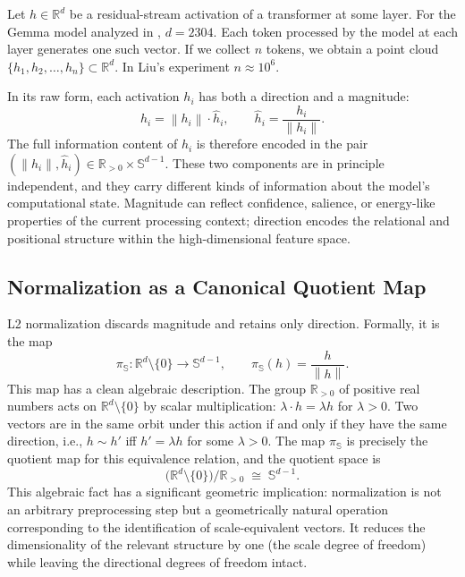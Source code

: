 \documentclass[12pt, a4paper]{article}
\theoremstyle{plain}
\theoremstyle{definition}
\theoremstyle{remark}
\newcommand{\R}{\mathbb{R}}
\newcommand{\Sph}{\mathbb{S}}
\newcommand{\norm}[1]{\left\|#1\right\|}
\newcommand{\hh}{\hat{h}}
\newcommand{\lra}{\longrightarrow}
\begin{document}
Let $h \in \R^d$ be a residual-stream activation of a transformer at some
layer. For the Gemma model analyzed in \cite{liu2026normgeometry}, $d = 2304$.
Each token processed by the model at each layer generates one such vector.
If we collect $n$ tokens, we obtain a point cloud $\{h_1, h_2, \ldots, h_n\}
\subset \R^d$. In Liu's experiment $n \approx 10^6$.

In its raw form, each activation $h_i$ has both a direction and a magnitude:
\begin{equation}
  h_i = \norm{h_i} \cdot \hh_i,
  \qquad
  \hh_i = \frac{h_i}{\norm{h_i}}.
\end{equation}
The full information content of $h_i$ is therefore encoded in the pair
$(\norm{h_i}, \hh_i) \in \R_{>0} \times \Sph^{d-1}$. These two components are
in principle independent, and they carry different kinds of information about
the model's computational state. Magnitude can reflect confidence, salience,
or energy-like properties of the current processing context; direction encodes
the relational and positional structure within the high-dimensional feature
space.

\subsection{Normalization as a Canonical Quotient Map}

L2 normalization discards magnitude and retains only direction. Formally, it
is the map
\begin{equation}
  \pi_{\Sph} : \R^d \setminus \{0\} \lra \Sph^{d-1},
  \qquad
  \pi_{\Sph}(h) = \frac{h}{\norm{h}}.
\end{equation}
This map has a clean algebraic description. The group $\R_{>0}$ of positive
real numbers acts on $\R^d \setminus \{0\}$ by scalar multiplication:
$\lambda \cdot h = \lambda h$ for $\lambda > 0$. Two vectors are in the same
orbit under this action if and only if they have the same direction, i.e.,
$h \sim h'$ iff $h' = \lambda h$ for some $\lambda > 0$. The map
$\pi_{\Sph}$ is precisely the quotient map for this equivalence relation, and
the quotient space is
\begin{equation}
  \bigl(\R^d \setminus \{0\}\bigr) \big/ \R_{>0} \;\cong\; \Sph^{d-1}.
\end{equation}
This algebraic fact has a significant geometric implication: normalization is
not an arbitrary preprocessing step but a geometrically natural operation
corresponding to the identification of scale-equivalent vectors. It reduces the
dimensionality of the relevant structure by one (the scale degree of freedom)
while leaving the directional degrees of freedom intact.
\end{document}
